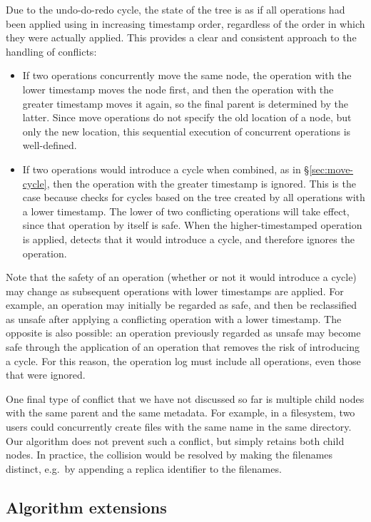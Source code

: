 \documentclass[sigplan,anonymous]{acmart}
\begin{document}
Due to the undo-do-redo cycle, the state of the tree is as if all operations had been applied using  in increasing timestamp order, regardless of the order in which they were actually applied.
This provides a clear and consistent approach to the handling of conflicts:
\begin{itemize}
    \item If two operations concurrently move the same node, the operation with the lower timestamp moves the node first, and then the operation with the greater timestamp moves it again, so the final parent is determined by the latter.
        Since move operations do not specify the old location of a node, but only the new location, this sequential execution of concurrent operations is well-defined.
    \item If two operations would introduce a cycle when combined, as in \S\ref{sec:move-cycle}, then the operation with the greater timestamp is ignored.
        This is the case because  checks for cycles based on the tree created by all operations with a lower timestamp.
        The lower of two conflicting operations will take effect, since that operation by itself is safe.
        When the higher-timestamped operation is applied,  detects that it would introduce a cycle, and therefore ignores the operation.
\end{itemize}

Note that the safety of an operation (whether or not it would introduce a cycle) may change as subsequent operations with lower timestamps are applied.
For example, an operation may initially be regarded as safe, and then be reclassified as unsafe after applying a conflicting operation with a lower timestamp.
The opposite is also possible: an operation previously regarded as unsafe may become safe through the application of an operation that removes the risk of introducing a cycle.
For this reason, the operation log must include all operations, even those that were ignored.

One final type of conflict that we have not discussed so far is multiple child nodes with the same parent and the same metadata.
For example, in a filesystem, two users could concurrently create files with the same name in the same directory.
Our algorithm does not prevent such a conflict, but simply retains both child nodes.
In practice, the collision would be resolved by making the filenames distinct, e.g.\ by appending a replica identifier to the filenames.

\subsection{Algorithm extensions}\label{sec:extensions}
\end{document}
